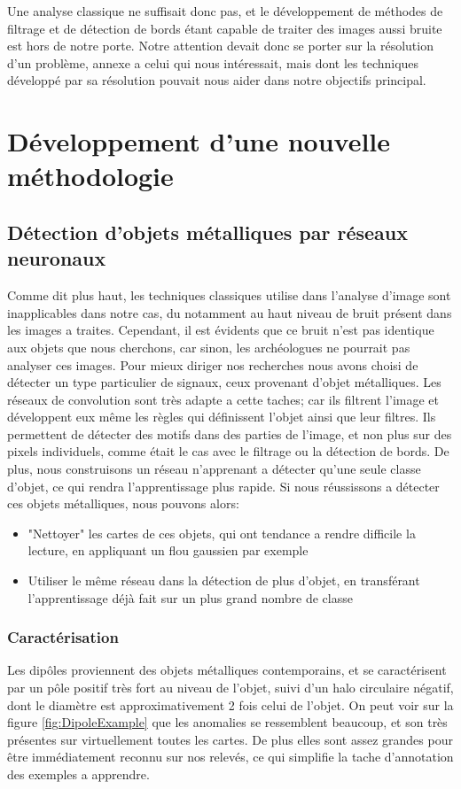 \documentclass[a4paper, 12pt, titlepage, oneside, french]{article}
\begin{document}
	Une analyse classique ne suffisait donc pas, et le développement de méthodes de filtrage et de détection de bords étant capable de traiter des images aussi bruite est hors de notre porte. Notre attention devait donc se porter sur la résolution d'un problème, annexe a celui qui nous intéressait, mais dont les techniques développé par sa résolution pouvait nous aider dans notre objectifs principal.

\newpage
\section{Développement d'une nouvelle méthodologie}
	\subsection{Détection d'objets métalliques par réseaux neuronaux}
	Comme dit plus haut, les techniques classiques utilise dans l'analyse d'image sont inapplicables dans notre cas, du notamment au haut niveau de bruit présent dans les images a traites. Cependant, il est évidents que ce bruit n'est pas identique aux objets que nous cherchons, car sinon, les archéologues ne pourrait pas analyser ces images. Pour mieux diriger nos recherches nous avons choisi de détecter un type particulier de signaux, ceux provenant d'objet métalliques. Les réseaux de convolution sont très adapte a cette taches; car ils filtrent l'image et développent eux même les règles qui définissent l'objet ainsi que leur filtres. Ils permettent de détecter des motifs dans des parties de l'image, et non plus sur des pixels individuels, comme était le cas avec le filtrage ou la détection de bords. De plus, nous construisons un réseau n'apprenant a détecter qu'une seule classe d'objet, ce qui rendra l'apprentissage plus rapide. Si nous réussissons a détecter ces objets métalliques, nous pouvons alors:
	\begin{itemize}
		\item "Nettoyer" les cartes de ces objets, qui ont tendance a rendre difficile la lecture, en appliquant un flou gaussien par exemple
		\item Utiliser le même réseau dans la détection de plus d'objet, en transférant l'apprentissage déjà fait sur un plus grand nombre de classe
	\end{itemize}

	\subsubsection{Caractérisation}
	Les dipôles proviennent des objets métalliques contemporains, et se caractérisent par un pôle positif très fort au niveau de l'objet, suivi d'un halo circulaire négatif, dont le diamètre est approximativement 2 fois celui de l'objet. On peut voir sur la figure \ref{fig:DipoleExample} que les anomalies se ressemblent beaucoup, et son très présentes sur virtuellement toutes les cartes. De plus elles sont assez grandes pour être immédiatement reconnu sur nos relevés, ce qui simplifie la tache d'annotation des exemples a apprendre. 
\end{document}
